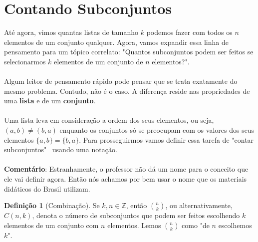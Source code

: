 \documentclass[a4paper,11pt]{book}
\theoremstyle{definition}
\theoremstyle{break}
\newtheorem{definition}{Definição}[section]
\begin{document}
\section{Contando Subconjuntos}

Até agora, vimos quantas listas de tamanho $k$ podemos fazer com todos os $n$ elementos de um conjunto qualquer. Agora, vamos expandir essa linha de pensamento para um tópico correlato: "Quantos subconjuntos podem ser feitos se selecionarmos $k$ elementos de um conjunto de $n$ elementos?". 
\\
\\
Algum leitor de pensamento rápido pode pensar que se trata exatamente do mesmo problema. Contudo, não é o caso. A diferença reside nas propriedades de uma \textbf{lista} e de um \textbf{conjunto}.
\\
\\
Uma lista leva em consideração a ordem dos seus elementos, ou seja, $(a,b) \neq (b,a)$ enquanto os conjuntos só se preocupam com os valores dos seus elementos $\{a,b\} = \{b,a\}$. Para prosseguirmos vamos definir essa tarefa de "contar subconjuntos" \ usando uma notação.
\\
\\
\textbf{Comentário}: Estranhamente, o professor não dá um nome para o conceito que ele vai definir agora. Então nós achamos por bem usar o nome que os materiais didáticos do Brasil utilizam.

\begin{definition}[Combinação]
Se $k,n \in \mathbb{Z}$, então $n \choose k$, ou alternativamente, $C(n,k)$, denota o número de subconjuntos que podem ser feitos escolhendo $k$ elementos de um conjunto com $n$ elementos. Lemos $n \choose k$ como "de $n$ escolhemos $k$".
\end{definition}
\end{document}
